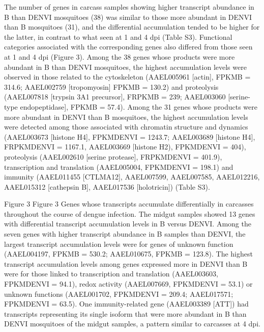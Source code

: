 The number of genes in carcass samples showing higher transcript abundance in B than DENVI mosquitoes (38) was similar to those more abundant in DENVI than B mosquitoes (31), and the differential accumulation tended to be higher for the latter, in contrast to what seen at 1 and 4 dpi (Table S3).
Functional categories associated with the corresponding genes also differed from those seen at 1 and 4 dpi (Figure 3).
Among the 38 genes whose products were more abundant in B than DENVI mosquitoes, the highest accumulation levels were observed in those related to the cytoskeleton (AAEL005961 [actin], FPKMB = 314.6; AAEL002759 [tropomyosin] FPKMB = 130.2) and proteolysis (AAEL007818 [trypsin 3A1 precursor], FRPKMB = 239; AAEL003060 [serine-type endopeptidase], FPKMB = 57.4).
Among the 31 genes whose products were more abundant in DENVI than B mosquitoes, the highest accumulation levels were detected among those associated with chromatin structure and dynamics (AAEL003673 [histone H4], FPKMDENVI = 1243.7; AAEL003689 [histone H4], FRPKMDENVI = 1167.1, AAEL003669 [histone H2), FPKMDENVI = 404), proteolysis (AAEL002610 [serine protease], FRPKMDENVI = 401.9), transcription and translation (AAEL005004, FPKMDENVI = 198.1) and immunity (AAEL011455 [CTLMA12], AAEL007599, AAEL007585, AAEL012216, AAEL015312 [cathepsin B], AAEL017536 [holotricin]) (Table S3).

Figure 3
Figure 3
Genes whose transcripts accumulate differentially in carcasses throughout the course of dengue infection.
The midgut samples showed 13 genes with differential transcript accumulation levels in B versus DENVI.
Among the seven genes with higher transcript abundance in B samples than DENVI, the largest transcript accumulation levels were for genes of unknown function (AAEL004197, FPKMB = 530.2; AAEL010675, FPKMB = 123.8).
The highest transcript accumulation levels among genes expressed more in DENVI than B were for those linked to transcription and translation (AAEL003603, FPKMDENVI = 94.1), redox activity (AAEL007669, FPKMDENVI = 53.1) or unknown functions (AAEL001702, FPKMDENVI = 209.4; AAEL017571; FPKMDENVI = 63.5).
One immunity-related gene (AAEL003389 [ATT]) had transcripts representing its single isoform that were more abundant in B than DENVI mosquitoes of the midgut samples, a pattern similar to carcasses at 4 dpi.

